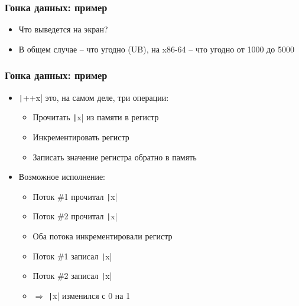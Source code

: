 \documentclass[10pt]{beamer}
\begin{document}
\begin{frame}[fragile]
\frametitle{Гонка данных: пример}
\begin{itemize}
\begin{tcblisting}{listing engine=minted, minted language=cpp, minted options={fontsize=\scriptsize}, listing only, colback=codebg, colframe=codebg, rounded corners}
int x = 0;

std::vector<std::thread> threads;
for (int i = 0; i < 5; ++i)
  threads.emplace_back([&x]{
    for (int i = 0; i < 1000; ++i)
      ++x;
  });

for (auto & thread : threads)
  thread.join();

std::cout << x << std::endl;
\end{tcblisting}
\pause
\item Что выведется на экран?
\pause
\item В общем случае -- что угодно (UB), на x86-64 -- что угодно от 1000 до 5000
\end{itemize}
\end{frame}

\begin{frame}[fragile]
\frametitle{Гонка данных: пример}
\begin{itemize}
\item \texttt|++x| это, на самом деле, три операции:
\pause
\begin{itemize}
\item Прочитать \texttt|x| из памяти в регистр
\pause
\item Инкрементировать регистр
\pause
\item Записать значение регистра обратно в память
\end{itemize}
\pause
\item Возможное исполнение:
\pause
\begin{itemize}
\item Поток \#1 прочитал \texttt|x|
\pause
\item Поток \#2 прочитал \texttt|x|
\pause
\item Оба потока инкрементировали регистр
\pause
\item Поток \#1 записал \texttt|x|
\pause
\item Поток \#2 записал \texttt|x|
\pause
\item \(\Longrightarrow\) \texttt|x| изменился с 0 на 1
\end{itemize}
\end{itemize}
\end{frame}
\end{document}
